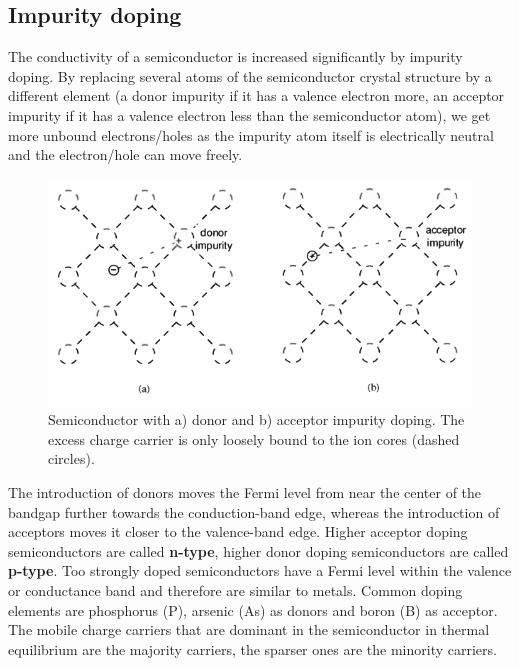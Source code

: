 \documentclass[main]{subfiles}
\begin{document}
\subsection{Impurity doping}

The conductivity of a semiconductor is increased significantly by impurity doping. By replacing several atoms of the semiconductor crystal structure by a different element (a donor impurity if it has a valence electron more, an acceptor impurity if it has a valence electron less than the semiconductor atom), we get more unbound electrons/holes as the impurity atom itself is electrically neutral and the electron/hole can move freely.

\begin{figure}[H]
\centering
\includegraphics[scale=0.4]{pics/impurity_doping.png}
\caption{Semiconductor with a) donor and b) acceptor impurity doping. The excess charge carrier is only loosely bound to the ion cores (dashed circles).}
\end{figure}

The introduction of donors moves the Fermi level from near the center of the bandgap further towards the conduction-band edge, whereas the
introduction of acceptors moves it closer to the valence-band edge. Higher acceptor doping semiconductors are called \textbf{n-type}, higher donor doping semiconductors are called \textbf{p-type}. Too strongly doped semiconductors have a Fermi level within the valence or conductance band and therefore are similar to metals. Common doping elements are phosphorus (P), arsenic (As) as donors and boron (B) as acceptor.\\
The mobile charge carriers that are dominant in the semiconductor in thermal equilibrium are the majority carriers, the sparser ones are the minority carriers.
\end{document}
